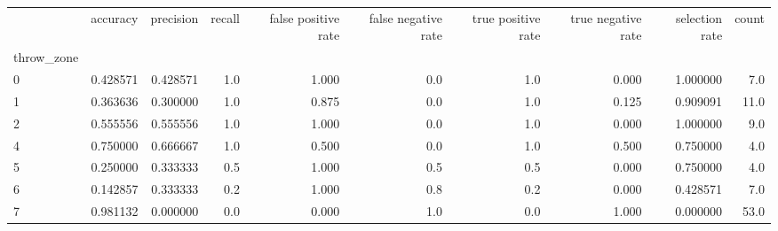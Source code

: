 \begin{tabular}{lrrrrrrrrr}
\toprule
{} &  accuracy &  precision &  recall &  false positive rate &  false negative rate &  true positive rate &  true negative rate &  selection rate &  count \\
throw\_zone &           &            &         &                      &                      &                     &                     &                 &        \\
\midrule
0          &  0.428571 &   0.428571 &     1.0 &                1.000 &                  0.0 &                 1.0 &               0.000 &        1.000000 &    7.0 \\
1          &  0.363636 &   0.300000 &     1.0 &                0.875 &                  0.0 &                 1.0 &               0.125 &        0.909091 &   11.0 \\
2          &  0.555556 &   0.555556 &     1.0 &                1.000 &                  0.0 &                 1.0 &               0.000 &        1.000000 &    9.0 \\
4          &  0.750000 &   0.666667 &     1.0 &                0.500 &                  0.0 &                 1.0 &               0.500 &        0.750000 &    4.0 \\
5          &  0.250000 &   0.333333 &     0.5 &                1.000 &                  0.5 &                 0.5 &               0.000 &        0.750000 &    4.0 \\
6          &  0.142857 &   0.333333 &     0.2 &                1.000 &                  0.8 &                 0.2 &               0.000 &        0.428571 &    7.0 \\
7          &  0.981132 &   0.000000 &     0.0 &                0.000 &                  1.0 &                 0.0 &               1.000 &        0.000000 &   53.0 \\
\bottomrule
\end{tabular}
